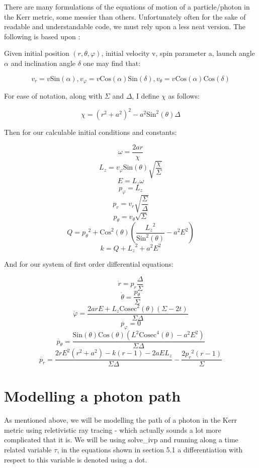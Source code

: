 \documentclass[oneside,openright,frontopenright]{dmathesis}
\begin{document}
	There are many formulations of the equations of motion of a particle/photon in the Kerr metric, some messier than others. Unfortunately often for the sake of readable and understandable code, we must rely upon a less neat version. The following is based upon \cite{yukterezKerr}:

	Given initial position $(r, \theta, \varphi)$, initial velocity v, spin parameter a, launch angle $\alpha$ and inclination angle $\delta$ one may find that:
	
	\[v_r = v\mbox{Sin}(\alpha), v_\varphi = v\mbox{Cos}(\alpha)\mbox{Sin}(\delta), v_\theta = v\mbox{Cos}(\alpha)\mbox{Cos}(\delta)\]

	For ease of notation, along with $\Sigma$ and $\Delta$, I define $\chi$ as follows:

	\[\chi = (r^2+a^2)^2-a^2\mbox{Sin}^2(\theta)\Delta\]

	Then for our calculable initial conditions and constants:

	\[\omega = \frac{2ar}{\chi}\]
	\[L_{z} = v_{\varphi}\mbox{Sin}(\theta)\sqrt{\frac{\chi}{\Sigma}}\]
	\[ E = L_{z}\omega\]
	\[p_{\varphi} = L_{z}\]
	\[p_{r} = v_{r}\sqrt{\frac{\Sigma}{\Delta}}\]
	\[p_{\theta} = v_{\theta}\sqrt{\Sigma}\]
	\[Q = {p_{\theta}}^2+\mbox{Cos}^2(\theta)\left(\frac{{L_{z}}^2}{\mbox{Sin}^2(\theta)}-a^2E^2\right)\]
	\[k = Q+{L_{z}}^2+a^2E^2\]

	And for our system of first order differential equations:

	\[\dot{r} = p_r\frac{\Delta}{\Sigma}\]
	\[\dot{\theta} = \frac{p_\theta}{\Sigma}\]
	\[\dot{\varphi} = \frac{2arE+L_{z}\mbox{Cosec}^2(\theta)(\Sigma-2t)}{\Sigma\Delta}\]
	\[\dot{p_{\varphi}} = 0\]
	\[\dot{p_{\theta}} = \frac{\mbox{Sin}(\theta)\mbox{Cos}(\theta)(L^2\mbox{Cosec}^4(\theta)-a^2E^2)}{\Sigma\Delta}\]
	\[\dot{p_{r}} = \frac{2rE^2(r^2+a^2)-k(r-1)-2aEL_{z}}{\Sigma\Delta}-\frac{2{p_{r}}^2(r-1)}{\Sigma}\]

\section{Modelling a photon path}

	As mentioned above, we will be modelling the path of a photon in the Kerr metric using reletivistic ray tracing - which actually sounds a lot more complicated that it is. We will be using solve\_ivp and running along a time related variable $\tau$, in the equations shown in section 5.1 a differentiation with respect to this variable is denoted using a dot.
\end{document}
